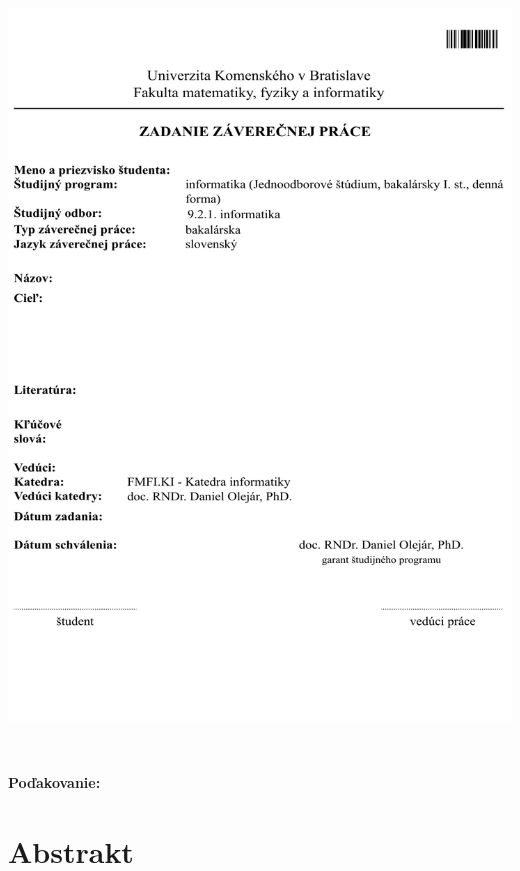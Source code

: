 \documentclass[12pt, oneside]{book}
\begin{document}
\newpage 
\thispagestyle{empty}
\hspace{-2cm}\includegraphics[width=1.1\textwidth]{images/zadanie}


\frontmatter

\setcounter{page}{3}
\newpage 
~

\vfill
{\bf Poďakovanie:}


\newpage 
\section*{Abstrakt}
\end{document}
